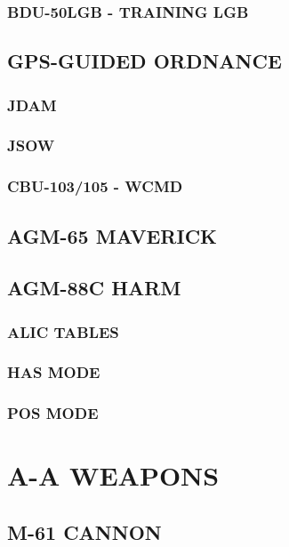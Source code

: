 \documentclass[fontInter]{TechCheck}
\begin{document}
	\subsection{BDU-50LGB - TRAINING LGB}

	\clearpage 

	\section{GPS-GUIDED ORDNANCE}
	\subsection{JDAM}
	\subsection{JSOW}
	\subsection{CBU-103/105 - WCMD}

	\clearpage

	\section{AGM-65 MAVERICK}

	\clearpage 

	\section{AGM-88C HARM}

	\subsection{ALIC TABLES}
	\subsection{HAS MODE}
	\subsection{POS MODE}

	\cleardoublepage

	\chapter{A-A WEAPONS}
	\minitoc
	\cleardoublepage

	\section{M-61 CANNON}
\end{document}
